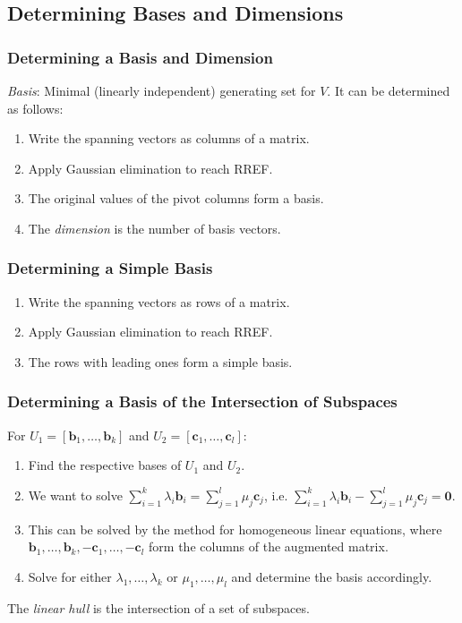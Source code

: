 \documentclass[10pt,twoside,twocolumn]{article}
\begin{document}
\subsection{Determining Bases and Dimensions}


\subsubsection{Determining a Basis and Dimension}

\emph{Basis}: Minimal (linearly independent) generating set for $V$.
It can be determined as follows: 
\begin{enumerate}
\item Write the spanning vectors as columns of a matrix. 
\item Apply Gaussian elimination to reach RREF. 
\item The original values of the pivot columns form a basis. 
\item The \emph{dimension} is the number of basis vectors. 
\end{enumerate}

\subsubsection{Determining a Simple Basis}
\begin{enumerate}
\item Write the spanning vectors as rows of a matrix. 
\item Apply Gaussian elimination to reach RREF. 
\item The rows with leading ones form a simple basis. 
\end{enumerate}

\subsubsection{Determining a Basis of the Intersection of Subspaces}

For $U_{1}=\left[\mathbf{b}_{1},\dots,\mathbf{b}_{k}\right]$ and
$U_{2}=\left[\mathbf{c}_{1},\dots,\mathbf{c}_{l}\right]$: 
\begin{enumerate}
\item Find the respective bases of $U_{1}$ and $U_{2}$. 
\item We want to solve $\sum_{i=1}^{k}\lambda_{i}\mathbf{b}_{i}=\sum_{j=1}^{l}\mu_{j}\mathbf{c}_{j}$,
i.e. $\sum_{i=1}^{k}\lambda_{i}\mathbf{b}_{i}-\sum_{j=1}^{l}\mu_{j}\mathbf{c}_{j}=\mathbf{0}$. 
\item This can be solved by the method for homogeneous linear equations,
where $\mathbf{b}_{1},\dots,\mathbf{b}_{k},-\mathbf{c}_{1},\dots,-\mathbf{c}_{l}$
form the columns of the augmented matrix. 
\item Solve for either $\lambda_{1},\dots,\lambda_{k}$ or $\mu_{1},\dots,\mu_{l}$
and determine the basis accordingly. 
\end{enumerate}
The \emph{linear hull} is the intersection of a set of subspaces.
\end{document}
